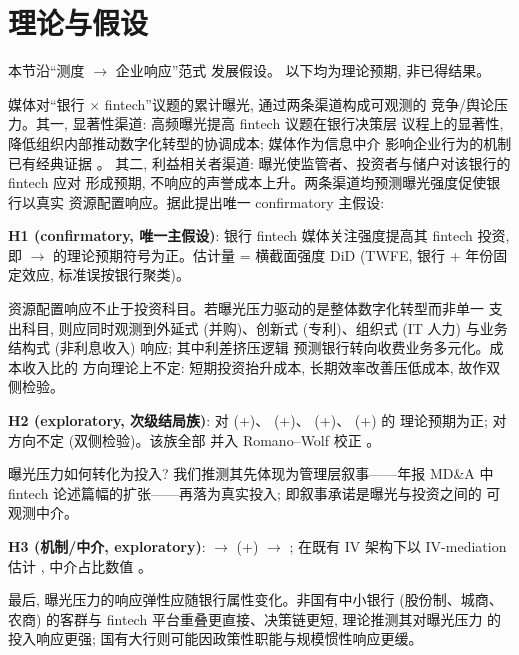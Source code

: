 \section{理论与假设}\label{sec:theory}

本节沿``测度 $\to$ 企业响应''范式 \parencite{hassan2019firm} 发展假设。
以下均为理论预期, 非已得结果。

媒体对``银行 $\times$ fintech''议题的累计曝光, 通过两条渠道构成可观测的
竞争/舆论压力。其一, 显著性渠道: 高频曝光提高 fintech 议题在银行决策层
议程上的显著性, 降低组织内部推动数字化转型的协调成本; 媒体作为信息中介
影响企业行为的机制已有经典证据 \parencite{fang2009media,engelberg2011causal}。
其二, 利益相关者渠道: 曝光使监管者、投资者与储户对该银行的 fintech 应对
形成预期, 不响应的声誉成本上升。两条渠道均预测曝光强度促使银行以真实
资源配置响应。据此提出唯一 confirmatory 主假设:

\textbf{H1 (confirmatory, 唯一主假设)}: 银行 fintech 媒体关注强度提高其
fintech 投资, 即  $\to$
 的理论预期符号为正。估计量 = 横截面强度
DiD (TWFE, 银行 + 年份固定效应, 标准误按银行聚类)。

资源配置响应不止于投资科目。若曝光压力驱动的是整体数字化转型而非单一
支出科目, 则应同时观测到外延式 (并购)、创新式 (专利)、组织式 (IT 人力)
与业务结构式 (非利息收入) 响应; 其中利差挤压逻辑
\parencite{parlour2022payment} 预测银行转向收费业务多元化。成本收入比的
方向理论上不定: 短期投资抬升成本, 长期效率改善压低成本, 故作双侧检验。

\textbf{H2 (exploratory, 次级结局族)}:  对
 (+)、 (+)、
 (+)、 (+) 的
理论预期为正; 对  方向不定 (双侧检验)。该族全部
并入 Romano--Wolf 校正 \parencite{romanowolf2005snooping}。

曝光压力如何转化为投入? 我们推测其先体现为管理层叙事——年报 MD\&A 中
fintech 论述篇幅的扩张——再落为真实投入; 即叙事承诺是曝光与投资之间的
可观测中介。

\textbf{H3 (机制/中介, exploratory)}:  $\to$
 (+) $\to$ ;
在既有 IV 架构下以 IV-mediation 估计 \parencite{dippel2020ivmediate},
中介占比数值 。

最后, 曝光压力的响应弹性应随银行属性变化。非国有中小银行 (股份制、城商、
农商) 的客群与 fintech 平台重叠更直接、决策链更短, 理论推测其对曝光压力
的投入响应更强; 国有大行则可能因政策性职能与规模惯性响应更缓。

